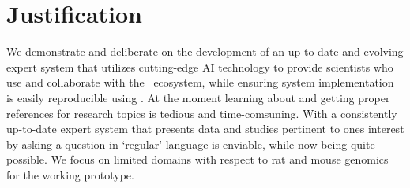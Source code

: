 \section{Justification}
We demonstrate and deliberate on the development of an up-to-date and evolving expert system that utilizes cutting-edge AI technology to provide scientists who use and collaborate with the \GN\ ecosystem, while ensuring system implementation is easily reproducible using \guix. 
At the moment learning about and getting proper references for research topics is tedious and time-comsuning. 
With a consistently up-to-date expert system that presents data and studies pertinent to ones interest by asking a question in `regular' language is enviable, while now being quite possible.
We focus on limited domains with respect to rat and mouse genomics for the working prototype.